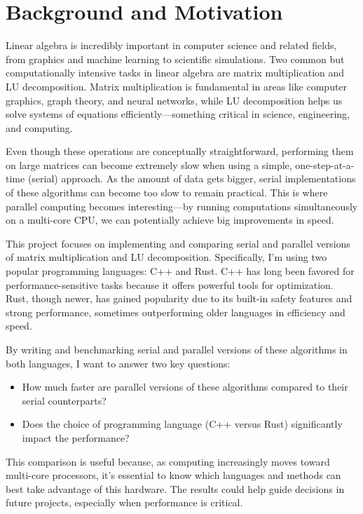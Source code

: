 \documentclass[12pt]{article}
\begin{document}
\section{Background and Motivation}
\begin{singlespace}

    Linear algebra is incredibly important in computer science and related fields, from graphics and machine learning to scientific simulations.
    Two common but computationally intensive tasks in linear algebra are matrix multiplication and LU decomposition. Matrix multiplication is fundamental
    in areas like computer graphics, graph theory, and neural networks, while LU decomposition helps us solve systems of equations
    efficiently---something critical in science, engineering, and computing.

    \vspace{1em}

    Even though these operations are conceptually straightforward, performing them on large matrices can become extremely slow when using a simple,
    one-step-at-a-time (serial) approach. As the amount of data gets bigger, serial implementations of these algorithms can become too slow to remain practical. This is
    where parallel computing becomes interesting---by running computations simultaneously on a multi-core CPU, we can potentially
    achieve big improvements in speed.

    \vspace{1em}

    This project focuses on implementing and comparing serial and parallel versions of matrix multiplication and LU decomposition. Specifically,
    I'm using two popular programming languages: C++ and Rust. C++ has long been favored for performance-sensitive tasks because it offers powerful
    tools for optimization. Rust, though newer, has gained popularity due to its built-in safety features and strong performance, sometimes outperforming
    older languages in efficiency and speed.

    \vspace{1em}

    By writing and benchmarking serial and parallel versions of these algorithms in both languages, I want to answer two key questions:

    \begin{itemize}
        \item{}
        How much faster are parallel versions of these algorithms compared to their serial counterparts?
        \item{}
        Does the choice of programming language (C++ versus Rust) significantly impact the performance?
    \end{itemize}

    This comparison is useful because, as computing increasingly moves toward multi-core processors, it's essential to know which languages and methods can
    best take advantage of this hardware. The results could help guide decisions in future projects, especially when performance is critical.
\end{singlespace}
\end{document}
